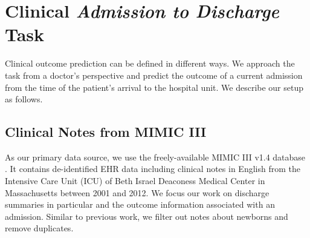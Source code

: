 \documentclass[11pt,a4paper]{article}
\begin{document}
\begin{table}[t]
      \caption{Distribution of labels for \textit{Mortality Prediction} and \textit{Length of Stay} task. Both tasks have unbalanced class distributions.}
      \label{singlelabel_task_stats}
\end{table}

\section{Clinical \emph{Admission to Discharge} Task}
Clinical outcome prediction can be defined in different ways. We approach the task from a doctor's perspective and predict the outcome of a current admission from the time of the patient's arrival to the hospital unit. We describe our setup as follows.

\subsection{Clinical Notes from MIMIC III}
As our primary data source, we use the freely-available MIMIC III v1.4 database \cite{mimic}. It contains de-identified EHR data including clinical notes in English from the Intensive Care Unit (ICU) of Beth Israel Deaconess Medical Center in Massachusetts between 2001 and 2012. We focus our work on discharge summaries in particular and the outcome information associated with an admission. Similar to previous work, we filter out notes about newborns and remove duplicates.
\end{document}
